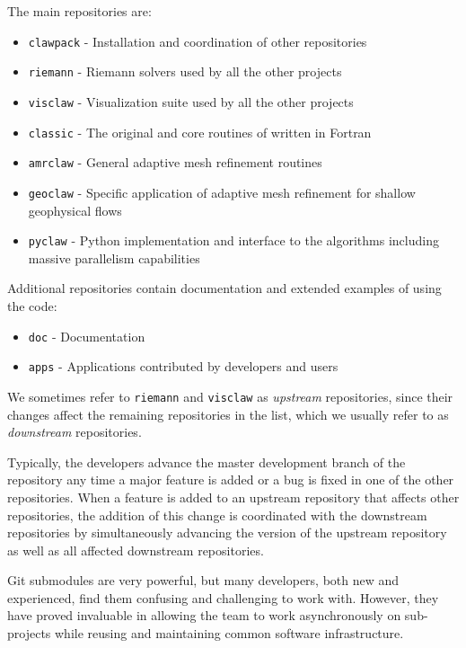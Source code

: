 The main \clawpack repositories are:
\begin{itemize}
    \item \texttt{clawpack} - Installation and coordination of other repositories
    \item \texttt{riemann} - Riemann solvers used by all the other projects
    \item \texttt{visclaw} - Visualization suite used by all the other projects
    \item \texttt{classic} - The original and core routines of \clawpack written in Fortran
    \item \texttt{amrclaw} - General adaptive mesh refinement routines
    \item \texttt{geoclaw} - Specific application of adaptive mesh refinement for shallow geophysical flows
    \item \texttt{pyclaw} - Python implementation and interface to the \clawpack algorithms including massive parallelism capabilities
\end{itemize}

Additional repositories contain documentation and extended examples of
using the code: 
\begin{itemize}
    \item \texttt{doc} - Documentation
    \item \texttt{apps} - Applications contributed by developers and users
\end{itemize}

We sometimes refer to \texttt{riemann} and \texttt{visclaw} as
\textit{upstream} repositories, since their changes affect the
remaining repositories in the list, which we usually refer to as
\textit{downstream} repositories.

Typically, the \clawpack developers advance the master development
branch of the repository any time a major feature is added or a bug is
fixed in one of the other repositories.  When a feature is added to an
upstream repository that affects other repositories, the addition of
this change is coordinated with the downstream repositories by
simultaneously advancing the version of the upstream repository as
well as all affected downstream repositories.  

Git submodules are very powerful, but many developers, both new and
experienced, find them confusing and challenging to work with.
However, they have proved invaluable in allowing the \clawpack team to
work asynchronously on sub-projects while reusing and maintaining
common software infrastructure.

